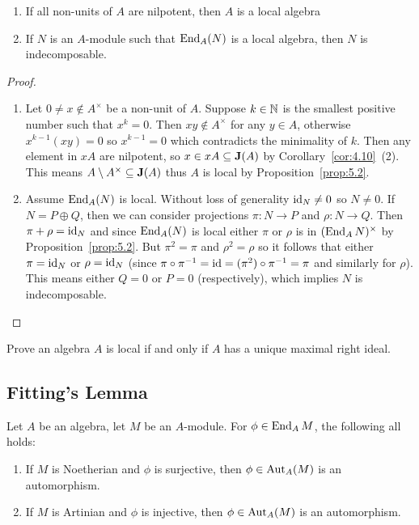 \begin{corollary}\label{cor:5.3}
\begin{enumerate}
\item If all non-units of $A$ are nilpotent, then $A$ is a local algebra
\item If $N$ is an $A$-module such that $\operatorname{End}_{A}(N)$ is a local
algebra, then $N$ is indecomposable.
\end{enumerate}
\end{corollary}

\begin{proof}
\begin{enumerate}
\item Let $0\neq x\notin A^{\times}$ be a non-unit of $A$. Suppose $k\in\mathbb{N}$
is the smallest positive number such that $x^{k}=0$. Then $xy\notin A^{\times}$
for any $y\in A$, otherwise $x^{k-1}(xy)=0$ so $x^{k-1}=0$ which
contradicts the minimality of $k$. Then any element in $xA$ are
nilpotent, so $x\in xA\subseteq\operatorname{\textup{\textbf{J}}}(A)$ by Corollary~\ref{cor:4.10}~(2).
This means $A\setminus A^{\times}\subseteq\operatorname{\textup{\textbf{J}}}(A)$ thus $A$ is
local by Proposition~\ref{prop:5.2}.
\item Assume $\operatorname{End}_{A}(N)$ is local. Without loss of generality
$\operatorname{id}_{N}\neq0$ so $N\neq0$. If $N=P\oplus Q$, then we can consider
projections $\pi\colon N\to P$ and $\rho\colon N\to Q$. Then
$\pi+\rho=\operatorname{id}_{N}$ and since $\operatorname{End}_{A}(N)$ is local either $\pi$ or
$\rho$ is in $(\operatorname{End}_{A}N)^{\times}$ by Proposition~\ref{prop:5.2}. But
$\pi^{2}=\pi$ and $\rho^{2}=\rho$ so it follows that either
$\pi=\operatorname{id}_{N}$ or $\rho=\operatorname{id}_{N}$ (since
$\pi\circ\pi^{-1}=\operatorname{id}=(\pi^{2})\circ\pi^{-1}=\pi$ and similarly for
$\rho$). This means either $Q=0$ or $P=0$ (respectively), which
implies $N$ is indecomposable.\qedhere
\end{enumerate}
\end{proof}

\begin{xca}
Prove an algebra $A$ is local if and only if $A$ has a unique maximal
right ideal.
\end{xca}

\subsection{Fitting's Lemma}

\begin{lemma}
Let $A$ be an algebra, let $M$ be an $A$-module.
For $\phi\in\operatorname{End}_{A}M$, the following all holds:
\begin{enumerate}
\item If $M$ is Noetherian and $\phi$ is surjective, then
  $\phi\in\operatorname{Aut}_{A}(M)$ is an automorphism.
\item If $M$ is Artinian and $\phi$ is injective, then
  $\phi\in\operatorname{Aut}_{A}(M)$ is an automorphism.
\end{enumerate}
\end{lemma}


